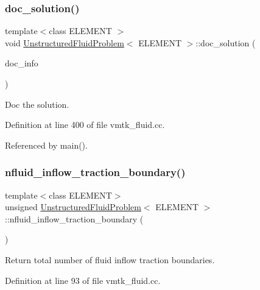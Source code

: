 \subsubsection{\texorpdfstring{doc\+\_\+solution()}{doc\_solution()}}
{\footnotesize\ttfamily template$<$class E\+L\+E\+M\+E\+NT $>$ \\
void \hyperlink{classUnstructuredFluidProblem}{Unstructured\+Fluid\+Problem}$<$ E\+L\+E\+M\+E\+NT $>$\+::doc\+\_\+solution (\begin{DoxyParamCaption}\item[{Doc\+Info \&}]{doc\+\_\+info }\end{DoxyParamCaption})}



Doc the solution. 



Definition at line 400 of file vmtk\+\_\+fluid.\+cc.



Referenced by main().

\mbox{\label{classUnstructuredFluidProblem_a8afc18327561107094fa94f2918a385f}} 
\subsubsection{\texorpdfstring{nfluid\+\_\+inflow\+\_\+traction\+\_\+boundary()}{nfluid\_inflow\_traction\_boundary()}}
{\footnotesize\ttfamily template$<$class E\+L\+E\+M\+E\+NT$>$ \\
unsigned \hyperlink{classUnstructuredFluidProblem}{Unstructured\+Fluid\+Problem}$<$ E\+L\+E\+M\+E\+NT $>$\+::nfluid\+\_\+inflow\+\_\+traction\+\_\+boundary (\begin{DoxyParamCaption}{ }\end{DoxyParamCaption})\hspace{0.3cm}{\ttfamily [inline]}}



Return total number of fluid inflow traction boundaries. 



Definition at line 93 of file vmtk\+\_\+fluid.\+cc.

